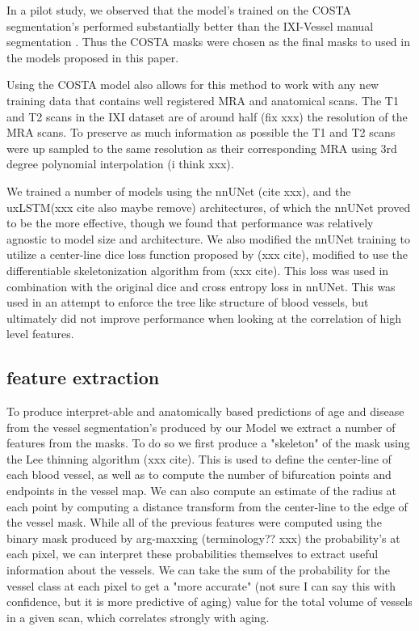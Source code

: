 \documentclass{article}
\begin{document}
In a pilot study, we observed that the model's trained on the COSTA segmentation's performed substantially better than the IXI-Vessel manual segmentation \cite{XXX}. Thus the COSTA masks were chosen as the final masks to used in the models proposed in this paper. 

Using the COSTA model also allows for this method to work with any new training data that contains well registered MRA and anatomical scans. The T1 and T2 scans in the IXI dataset are of around half (fix xxx) the resolution of the MRA scans. To preserve as much information as possible the T1 and T2 scans were up sampled to the same resolution as their corresponding MRA using 3rd degree polynomial interpolation (i think xxx).


We trained a number of models using the nnUNet (cite xxx), and the uxLSTM(xxx cite also maybe remove) architectures, of which the nnUNet proved to be the more effective, though we found that performance was relatively agnostic to model size and architecture. We also modified the nnUNet training to utilize a center-line dice loss function proposed by (xxx cite), modified to use the differentiable skeletonization algorithm from (xxx cite). This loss was used in combination with the original dice and cross entropy loss in nnUNet. This was used in an attempt to enforce the tree like structure of blood vessels, but ultimately did not improve performance when looking at the correlation of high level features.

\subsection{feature extraction}

To produce interpret-able and anatomically based predictions of age and disease from the vessel segmentation's produced by our Model we extract a number of features from the masks. To do so we first produce a "skeleton" of the mask using the Lee thinning algorithm (xxx cite). This is used to define the center-line of each blood vessel, as well as to compute the number of bifurcation points and endpoints in the vessel map. We can also compute an estimate of the radius at each point by computing a distance transform from the center-line to the edge of the vessel mask. While all of the previous features were computed using the binary mask produced by arg-maxxing (terminology?? xxx) the probability's at each pixel, we can interpret these probabilities themselves to extract useful information about the vessels. We can take the sum of the probability for the vessel class at each pixel to get a "more accurate" (not sure I can say this with confidence, but it is more predictive of aging) value for the total volume of vessels in a given scan, which correlates strongly with aging. 
\end{document}
